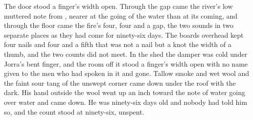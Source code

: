 The door stood a finger's width open. Through the gap came the river's low muttered note from , nearer at the going of the water than at its coming, and through the floor came the fire's four, four and a gap, the two sounds in two separate places as they had come for ninety-six days. The boards overhead kept four nails and four and a fifth that was not a nail but a knot the width of a thumb, and the two counts did not meet. In the shed the damper was cold under Jorra's bent finger, and the room off it stood a finger's width open with no name given to the men who had spoken in it and gone. Tallow smoke and wet wool and the faint sour tang of the unswept corner came down under the roof with the dark. His hand outside the wool went up an inch toward the note of water going over water and came down. He was ninety-six days old and nobody had told him so, and the count stood at ninety-six, unspent.
